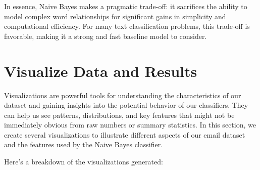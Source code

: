 \documentclass[12pt,letterpaper]{article}
\begin{document}
In essence, Naive Bayes makes a pragmatic trade-off: it sacrifices the ability to model complex word relationships for significant gains in simplicity and computational efficiency. For many text classification problems, this trade-off is favorable, making it a strong and fast baseline model to consider.

\section{Visualize Data and Results}

Visualizations are powerful tools for understanding the characteristics of our dataset and gaining insights into the potential behavior of our classifiers. They can help us see patterns, distributions, and key features that might not be immediately obvious from raw numbers or summary statistics. In this section, we create several visualizations to illustrate different aspects of our email dataset and the features used by the Naive Bayes classifier.

Here's a breakdown of the visualizations generated:
\end{document}
